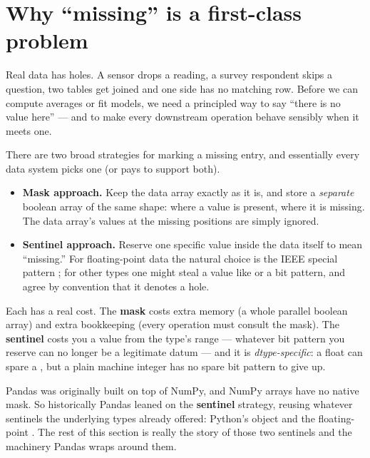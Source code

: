 \documentclass[11pt]{article}
\begin{document}

\section{Why ``missing'' is a first-class problem}

Real data has holes. A sensor drops a reading, a survey respondent skips a question, two tables get joined and one side has no matching row. Before we can compute averages or fit models, we need a principled way to say ``there is no value here'' --- and to make every downstream operation behave sensibly when it meets one.

\begin{background}
There are two broad strategies for marking a missing entry, and essentially every data system picks one (or pays to support both).

\begin{itemize}
  \item \textbf{Mask approach.} Keep the data array exactly as it is, and store a \emph{separate} boolean array of the same shape:  where a value is present,  where it is missing. The data array's values at the missing positions are simply ignored.
  \item \textbf{Sentinel approach.} Reserve one specific value inside the data itself to mean ``missing.'' For floating-point data the natural choice is the IEEE special pattern ; for other types one might steal a value like  or a bit pattern, and agree by convention that it denotes a hole.
\end{itemize}

Each has a real cost. The \textbf{mask} costs extra memory (a whole parallel boolean array) and extra bookkeeping (every operation must consult the mask). The \textbf{sentinel} costs you a value from the type's range --- whatever bit pattern you reserve can no longer be a legitimate datum --- and it is \emph{dtype-specific}: a float can spare a , but a plain machine integer has no spare bit pattern to give up.

Pandas was originally built on top of NumPy, and NumPy arrays have no native mask. So historically Pandas leaned on the \textbf{sentinel} strategy, reusing whatever sentinels the underlying types already offered: Python's  object and the floating-point . The rest of this section is really the story of those two sentinels and the machinery Pandas wraps around them.
\end{background}
\end{document}
